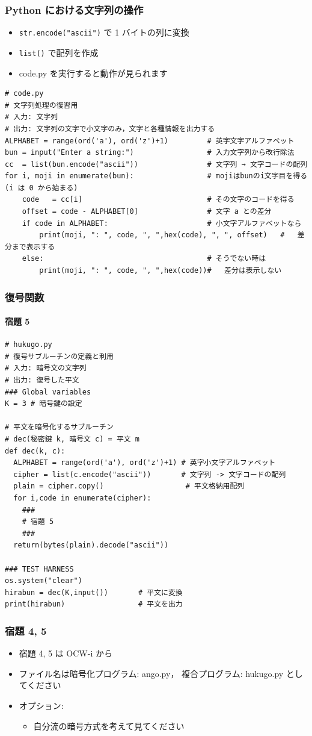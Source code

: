\begin{frame}
\frametitle{Python における文字列の操作}
  \begin{itemize}
\item {\tt str.encode("ascii")} で 1 バイトの列に変換
\item {\tt list()} で配列を作成
\item code.py を実行すると動作が見られます
  \end{itemize}
  \begin{lstlisting}[caption={code.py},label=lst:code]
# code.py
# 文字列処理の復習用
# 入力: 文字列
# 出力: 文字列の文字で小文字のみ，文字と各種情報を出力する
ALPHABET = range(ord('a'), ord('z')+1)         # 英字文字アルファベット
bun = input("Enter a string:")                 # 入力文字列から改行除法
cc  = list(bun.encode("ascii"))                # 文字列 → 文字コードの配列
for i, moji in enumerate(bun):                 # mojiはbunのi文字目を得る (i は 0 から始まる)
	code   = cc[i]                             # その文字のコードを得る
	offset = code - ALPHABET[0]                # 文字 a との差分
	if code in ALPHABET:                       # 小文字アルファベットなら
		print(moji, ": ", code, ", ",hex(code), ", ", offset)   #   差分まで表示する
	else:                                      # そうでない時は
		print(moji, ": ", code, ", ",hex(code))#   差分は表示しない
  \end{lstlisting}
\end{frame}
\begin{frame}
\frametitle{復号関数}
\framesubtitle{宿題 5}
  \begin{lstlisting}[caption={hukugo.py},label=lst:hukugo]
# hukugo.py
# 復号サブルーチンの定義と利用
# 入力: 暗号文の文字列
# 出力: 復号した平文
### Global variables
K = 3 # 暗号鍵の設定

# 平文を暗号化するサブルーチン
# dec(秘密鍵 k, 暗号文 c) = 平文 m
def dec(k, c):
  ALPHABET = range(ord('a'), ord('z')+1) # 英字小文字アルファベット
  cipher = list(c.encode("ascii"))       # 文字列 -> 文字コードの配列
  plain = cipher.copy()                   # 平文格納用配列
  for i,code in enumerate(cipher):
    ###
    # 宿題 5
    ###
  return(bytes(plain).decode("ascii"))

### TEST HARNESS
os.system("clear")
hirabun = dec(K,input())       # 平文に変換
print(hirabun)                 # 平文を出力
  \end{lstlisting}
\end{frame}
\begin{frame}
\frametitle{宿題 4, 5}
  \begin{itemize}
\item 宿題 4, 5 は OCW-i から
\item ファイル名は暗号化プログラム: ango.py， 複合プログラム: hukugo.py としてください
\item オプション: 
    \begin{itemize}
\item 自分流の暗号方式を考えて見てください
    \end{itemize}
  \end{itemize}
\end{frame}
%
%
